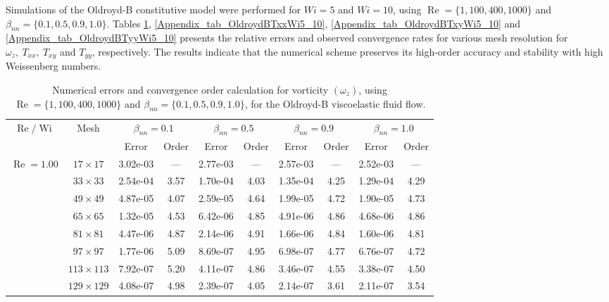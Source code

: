 \documentclass[preprint, 12pt]{elsarticle}
\begin{document}
Simulations of the Oldroyd-B constitutive model were performed for $Wi = 5$ and $Wi = 10$, using $\operatorname{Re}=\{1,100,400,1000\}$ and $\beta_{nn}=\{0.1,0.5,0.9,1.0\}$. Tables \ref{Appendix_tab_OldroydBWzWi5_10}, \ref{Appendix_tab_OldroydBTxxWi5_10}, \ref{Appendix_tab_OldroydBTxyWi5_10} and \ref{Appendix_tab_OldroydBTyyWi5_10} presents the relative errors and observed convergence rates for various mesh resolution for $\omega_z,\ T_{xx},\ T_{xy}$ and $T_{yy}$, respectively. The results indicate that the numerical scheme preserves its high-order accuracy and stability with high Weissenberg numbers.

\begin{center}
\begin{table}[H]
\caption{Numerical errors and convergence order calculation for vorticity $(\omega_{z})$, using $\operatorname{Re}=\{1,100,400,1000\}$ and $\beta_{nn}=\{0.1,0.5,0.9,1.0\}$, for the Oldroyd-B viscoelastic fluid flow.\label{Appendix_tab_OldroydBWzWi5_10}}
\tiny{
    \begin{tabular*}{\textwidth}{@{\extracolsep\fill}cccccccccc@{}}
    \hline
    \multirow{2}{*}{$\operatorname{Re}/\operatorname{Wi}$} & \multirow{2}{*}{Mesh} & \multicolumn{2}{c}{$\beta_{nn}=0.1$}  & \multicolumn{2}{c}{$\beta_{nn}=0.5$}  & \multicolumn{2}{c}{$\beta_{nn}=0.9$}  & \multicolumn{2}{c}{$\beta_{nn}=1.0$}\\ %
     & & Error & Order & Error & Order & Error & Order & Error & Order \\
    \hline
    \multirow{7}{*}{$\operatorname{Re}=1.00$} & $17\times 17$ & 3.02e-03 & --- & 2.77e-03 & --- & 2.57e-03 & --- & 2.52e-03 & --- \\
    & $33\times 33$ & 2.54e-04 & 3.57 & 1.70e-04 & 4.03 & 1.35e-04 & 4.25 & 1.29e-04 & 4.29 \\
    & $49\times 49$ & 4.87e-05 & 4.07 & 2.59e-05 & 4.64 & 1.99e-05 & 4.72 & 1.90e-05 & 4.73 \\
    \multirow{3}{*}{$\operatorname{Wi}=5$} & $65\times 65$ & 1.32e-05 & 4.53 & 6.42e-06 & 4.85 & 4.91e-06 & 4.86 & 4.68e-06 & 4.86 \\
    & $81\times 81$ & 4.47e-06 & 4.87 & 2.14e-06 & 4.91 & 1.66e-06 & 4.84 & 1.60e-06 & 4.81 \\
    & $97\times 97$ & 1.77e-06 & 5.09 & 8.69e-07 & 4.95 & 6.98e-07 & 4.77 & 6.76e-07 & 4.72 \\
    & $113\times 113$ & 7.92e-07 & 5.20 & 4.11e-07 & 4.86 & 3.46e-07 & 4.55 & 3.38e-07 & 4.50 \\
    & $129\times 129$ & 4.08e-07 & 4.98 & 2.39e-07 & 4.05 & 2.14e-07 & 3.61 & 2.11e-07 & 3.54 \\

\end{tabular*}}
\end{table}
\end{center}
\end{document}

